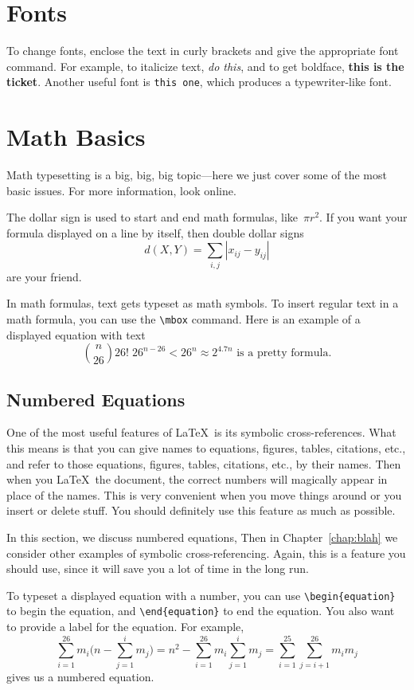 \section{Fonts}

To change fonts, enclose the text in curly brackets and give the appropriate font command.
For example, to italicize text, {\it do this}, and to get boldface, {\bf this is the ticket}.
Another useful font is {\tt this one}, which produces a typewriter-like font.


\section{Math Basics}

Math typesetting is a big, big, big topic---here we just cover some of
the most basic issues. For more information, look online.

The dollar sign is used to start and end math formulas, like~$\pi r^2$.
If you want your formula displayed on a line by itself, then double
dollar signs
$$
  d(X,Y) =  \sum_{i,j} |x_{ij} - y_{ij}| 
$$
are your friend.

In math formulas, text gets typeset as math symbols. To
insert regular text in a math formula, you can use the \verb+\mbox+
command. Here is an example of a displayed equation with text
$$
  {n\choose 26} 26!\;  26^{n-26} < 26^n \approx 2^{4.7n} \mbox{ is a pretty formula} .
$$ 


\subsection{Numbered Equations}

One of the most useful features of \LaTeX\ is its symbolic cross-references.
What this means is that you can give names to equations, figures, tables, citations, etc., and
refer to those equations, figures, tables, citations, etc., by their names. Then when you \LaTeX\
the document, the correct numbers will magically appear in place of the
names. This is very convenient when you move things around or you insert or delete
stuff. You should definitely use this feature as much as possible.

In this section, we discuss numbered equations, Then in Chapter~\ref{chap:blah}
we consider other examples of symbolic cross-referencing.
Again, this is a feature you should use, since it will save
you a lot of time in the long run.

To typeset a displayed equation with a number, you can 
use \verb+\begin{equation}+ to begin the equation, and \verb+\end{equation}+
to end the equation. You also want to provide a label for the equation.
For example,
\begin{equation}\label{eq:swaps}
  \sum_{i = 1}^{26} m_i \bigg( n - \sum_{j=1}^i m_j \bigg) 
    = n^2 - \sum_{i = 1}^{26} m_i  \sum_{j=1}^i m_j = \sum_{i=1}^{25} \sum_{j=i+1}^{26} m_i m_j 
\end{equation}
gives us a numbered equation. 

